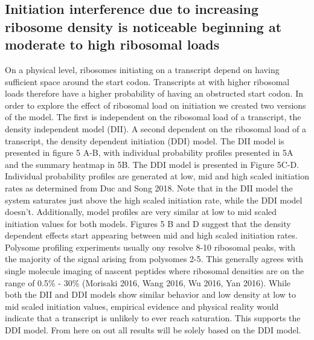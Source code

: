 \documentclass[review]{elsarticle}
\begin{document}
\subsection{Initiation interference due to increasing ribosome density is noticeable beginning at moderate to high ribosomal loads }

 On a physical level, ribosomes initiating on a transcript depend on having sufficient space around the start codon. Transcripts at with higher ribosomal loads therefore have a higher probability of having an obstructed start codon. In order to explore the effect of ribosomal load on initiation we created two versions of the model. The first is independent on the ribosomal load of a transcript, the density independent model (DII). A second dependent on the ribosomal load of a transcript, the density dependent initiation (DDI) model. The DII model is presented in figure 5 A-B, with individual probability profiles presented in 5A and the summary heatmap in 5B. The DDI model is presented in Figure 5C-D. Individual probability profiles are generated at low, mid and high scaled initiation rates as determined from Duc and Song 2018. Note that in the DII model the system saturates just above the high scaled initiation rate, while the DDI model doesn't. Additionally, model profiles are very similar at low to mid scaled initiation values for both models. Figures 5 B and D suggest that the density dependent effects start appearing between mid and high scaled initiation rates. Polysome profiling experiments usually ony resolve 8-10 ribosomal peaks, with the majority of the signal arising from polysomes 2-5. This generally agrees with single molecule imaging of nascent peptides where ribosomal densities are on the range of 0.5\% - 30\% (Morisaki 2016, Wang 2016, Wu 2016, Yan 2016). While both the DII and DDI models show similar behavior and low density at low to mid scaled initiation values, empirical evidence and physical reality would indicate that a transcript is unlikely to ever reach saturation. This supports the DDI model. From here on out all results will be solely based on the DDI model.
\end{document}

